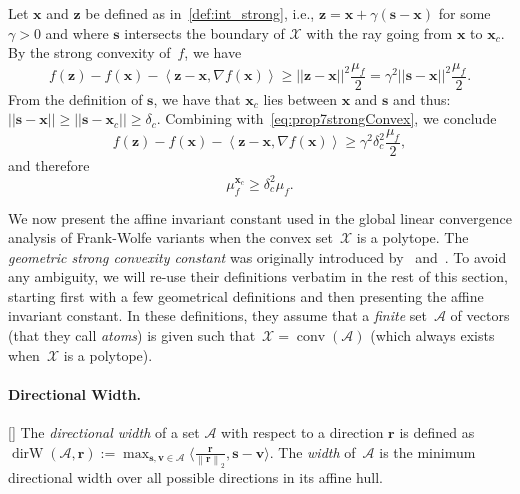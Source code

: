 \documentclass[twoside]{article}
\newcommand{\X}{\mathcal{X}}
\newcommand{\prodscal}[2]{\left\langle#1,#2\right\rangle}
\newcommand{\x}{\bm{x}}
\newcommand{\z}{\bm{z}}
\newcommand{\s}{\bm{s}}
\DeclareMathOperator*{\conv}{conv}
\providecommand{\normEucl}[1]{\left\lVert#1\right\rVert_2}
\newcommand{\stepsize}{\gamma}
\newcommand{\dirW}{\mathop{dirW}}
\newcommand{\vv}{\bm{v}} %
\newcommand{\A}{\mathcal{A}}
\renewcommand{\r}{\bm{r}}
\newcommand{\xc}{\x_c} %
\newcommand{\0}{\mathbf{0}} %
\begin{document}
  \proof 
  Let $\x$ and $\z$ be defined as in~\eqref{def:int_strong}, i.e., $\z = \x + \stepsize (\s - \x)$ for some $\stepsize > 0$ and where $\s$ intersects the boundary of $\X$ with the ray going from $\x$ to $\xc$.
  By the strong convexity of~$f$, we have
    \begin{equation} \label{eq:prop7strongConvex}
    f(\z)-f(\x) - \prodscal{\z-\x}{\nabla f(\x)} \geq ||\z-\x||^2 \frac{\mu_f}{2}
    = \stepsize^2 ||\s-\x||^2 \frac{\mu_f}{2}.
    \end{equation}
  From the definition of $\s$, we have that $\xc$ lies between $\x$ and $\s$ and thus:
  $||\s-\x||
  \geq ||\s - \xc|| \geq \delta_c$. Combining with~\eqref{eq:prop7strongConvex}, we conclude
    \begin{equation} f(\z)-f(\x) - \prodscal{\z-\x}{\nabla f(\x)} \geq
   \stepsize^2 \delta_c^2 \frac{\mu_f}{2}, \end{equation}
  and therefore 
    \begin{equation} \mu^{\xc}_f \geq \delta_c^2 \mu_f. \end{equation}
  \endproof
  
  We now present the affine invariant constant used in the global linear convergence analysis of Frank-Wolfe variants when the convex set~$\X$ is a polytope. The \emph{geometric strong convexity constant} was originally introduced by~ and~\citep{lacoste2015global}. To avoid any ambiguity, we will re-use their definitions verbatim in the rest of this section, starting first with a few geometrical definitions and then presenting the affine invariant constant. In these definitions, they assume that a \emph{finite} set~$\A$ of vectors (that they call \emph{atoms}) is given such that~$\X = \conv(\A)$ (which always exists when~$\X$ is a polytope).  

  \paragraph{Directional Width.}[\citet{lacoste2015global}]
  The \emph{directional width} of a set $\A$ with respect to a direction $\r$
  is defined as $\dirW(\A,\r) := \max_{\s, \vv \in\A}
  \big\langle \frac{\r}{\normEucl{\r}}, \s - \vv \big\rangle$. The \emph{width} of~$\A$
  is the minimum directional width over all possible directions in its affine
  hull.
\end{document}

